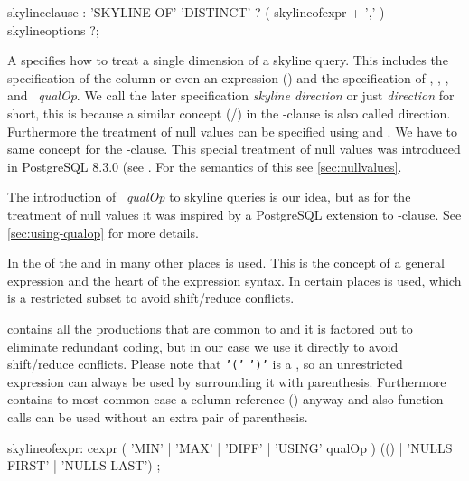 \begin{rail}
skylineclause : 
    'SKYLINE OF' 'DISTINCT' ? ( skylineofexpr + ',' ) skylineoptions ?;
\end{rail}

A  specifies how to treat a single dimension
of a skyline query. This includes the specification of the column
or even an expression () and the specification of
, , , and 
~\emph{qualOp}. We call the later specification 
\emph{skyline direction} or just \emph{direction} for short, this
is because a similar concept (/) in the
-clause is also called direction.  Furthermore the
treatment of null values can be specified using  and .  We have to same concept for the
-clause. This special treatment of null values 
was introduced in PostgreSQL 8.3.0 (see
. For
the semantics of this see \autoref{sec:nullvalues}.

The introduction of ~\emph{qualOp} to skyline queries
is our idea, but as for the treatment of null values it was inspired
by a PostgreSQL extension to -clause. See
\autoref{sec:using-qualop} for more details.

In the  of the  and in many other
places  is used. This is the concept of a general expression
and the heart of the expression syntax. In certain places 
is used, which is a restricted subset to avoid shift/reduce conflicts.

 contains all the productions that are common to 
and  it is factored out to eliminate redundant coding, but
in our case we use it directly to avoid shift/reduce conflicts. Please
note that \texttt{'('}  \texttt{')'} is a , so
an unrestricted expression can always be used by surrounding it with
parenthesis. Furthermore  contains to most common case a column
reference () anyway and also function calls can be used
without an extra pair of parenthesis.

\begin{rail}
skylineofexpr:
    cexpr ( 'MIN' | 'MAX' | 'DIFF' | 'USING' qualOp )
    (() | 'NULLS FIRST' | 'NULLS LAST') ;
\end{rail}


